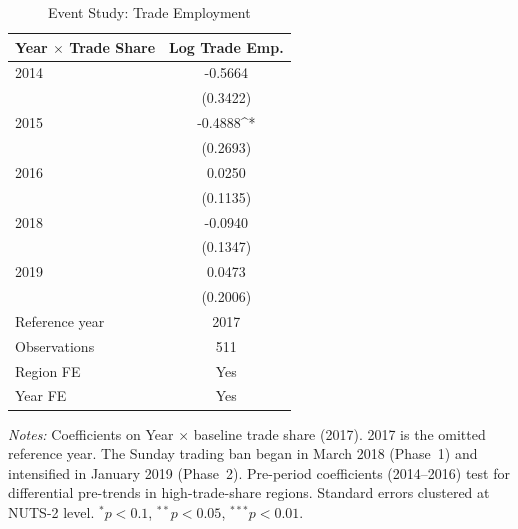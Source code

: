 \begin{table}[htbp]
\centering
\caption{Event Study: Trade Employment}
\label{tab:event}
\begin{tabular}{lc}
\hline\hline
Year $\times$ Trade Share & Log Trade Emp. \\
\hline
2014 & -0.5664 \\
 & (0.3422) \\
2015 & -0.4888^{*} \\
 & (0.2693) \\
2016 & 0.0250 \\
 & (0.1135) \\
2018 & -0.0940 \\
 & (0.1347) \\
2019 & 0.0473 \\
 & (0.2006) \\
\hline
Reference year & 2017 \\
Observations & 511 \\
Region FE & Yes \\
Year FE & Yes \\
\hline\hline
\end{tabular}
\begin{tablenotes}[flushleft]
\small
\item \textit{Notes:} Coefficients on Year $\times$ baseline trade share (2017). 2017 is the omitted reference year. The Sunday trading ban began in March 2018 (Phase~1) and intensified in January 2019 (Phase~2). Pre-period coefficients (2014--2016) test for differential pre-trends in high-trade-share regions. Standard errors clustered at NUTS-2 level. $^{*}p<0.1$, $^{**}p<0.05$, $^{***}p<0.01$.
\end{tablenotes}
\end{table}

